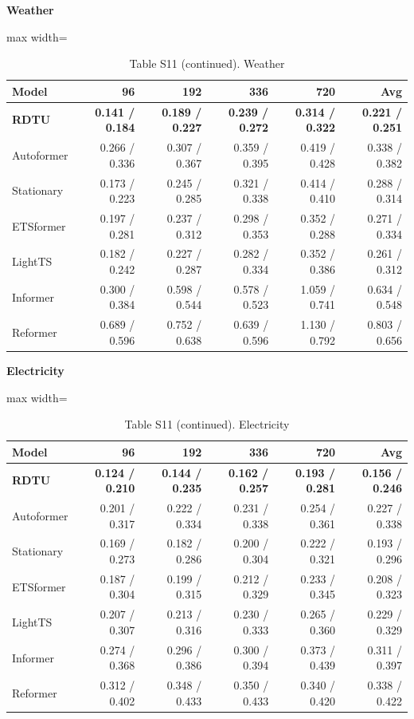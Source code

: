 \begin{table}[H]\centering\small
\caption*{Table S11 (continued). Weather}
\textbf{Weather}\par\smallskip
\begin{adjustbox}{max width=\linewidth}\begin{tabular}{lrrrrr}\toprule
\textbf{Model} & \textbf{96} & \textbf{192} & \textbf{336} & \textbf{720} & \textbf{Avg}\\\midrule
\rowcolor{blue!5}
\textbf{RDTU} & \textbf{0.141 / 0.184} & \textbf{0.189 / 0.227} & \textbf{0.239 / 0.272} & \textbf{0.314 / 0.322} & \textbf{0.221 / 0.251}\\
Autoformer & 0.266 / 0.336 & 0.307 / 0.367 & 0.359 / 0.395 & 0.419 / 0.428 & 0.338 / 0.382\\
Stationary & 0.173 / 0.223 & 0.245 / 0.285 & 0.321 / 0.338 & 0.414 / 0.410 & 0.288 / 0.314\\
ETSformer & 0.197 / 0.281 & 0.237 / 0.312 & 0.298 / 0.353 & 0.352 / 0.288 & 0.271 / 0.334\\
LightTS & 0.182 / 0.242 & 0.227 / 0.287 & 0.282 / 0.334 & 0.352 / 0.386 & 0.261 / 0.312\\
Informer & 0.300 / 0.384 & 0.598 / 0.544 & 0.578 / 0.523 & 1.059 / 0.741 & 0.634 / 0.548\\
Reformer & 0.689 / 0.596 & 0.752 / 0.638 & 0.639 / 0.596 & 1.130 / 0.792 & 0.803 / 0.656\\
\bottomrule\end{tabular}\end{adjustbox}\end{table}
\begin{table}[H]\centering\small
\caption*{Table S11 (continued). Electricity}
\textbf{Electricity}\par\smallskip
\begin{adjustbox}{max width=\linewidth}\begin{tabular}{lrrrrr}\toprule
\textbf{Model} & \textbf{96} & \textbf{192} & \textbf{336} & \textbf{720} & \textbf{Avg}\\\midrule
\rowcolor{blue!5}
\textbf{RDTU} & \textbf{0.124 / 0.210} & \textbf{0.144 / 0.235} & \textbf{0.162 / 0.257} & \textbf{0.193 / 0.281} & \textbf{0.156 / 0.246}\\
Autoformer & 0.201 / 0.317 & 0.222 / 0.334 & 0.231 / 0.338 & 0.254 / 0.361 & 0.227 / 0.338\\
Stationary & 0.169 / 0.273 & 0.182 / 0.286 & 0.200 / 0.304 & 0.222 / 0.321 & 0.193 / 0.296\\
ETSformer & 0.187 / 0.304 & 0.199 / 0.315 & 0.212 / 0.329 & 0.233 / 0.345 & 0.208 / 0.323\\
LightTS & 0.207 / 0.307 & 0.213 / 0.316 & 0.230 / 0.333 & 0.265 / 0.360 & 0.229 / 0.329\\
Informer & 0.274 / 0.368 & 0.296 / 0.386 & 0.300 / 0.394 & 0.373 / 0.439 & 0.311 / 0.397\\
Reformer & 0.312 / 0.402 & 0.348 / 0.433 & 0.350 / 0.433 & 0.340 / 0.420 & 0.338 / 0.422\\
\bottomrule\end{tabular}\end{adjustbox}\end{table}
